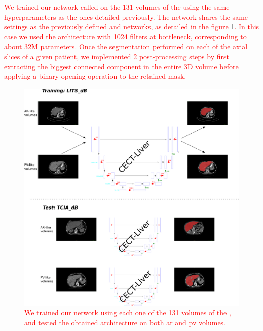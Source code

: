 \textcolor{red}
{
We trained our network called  on the 131 volumes of the
\textbf{} using the same hyperparameters as the ones detailed
previously. The network shares the same settings as the previously defined  and  networks, as detailed in the figure \ref{fig:CECTliverDetails}. In this case we used the architecture with 1024 filters at bottleneck, corresponding to about 32M parameters. Once the segmentation performed on each of the axial slices of a given patient, we implemented 2 post-processing steps by first extracting the biggest connected component in the entire 3D volume before applying a binary opening operation to the retained mask.
\begin{figure}[!ht]
	\begin{mdframed}[backgroundcolor=blue!50,linecolor=blue!50]
		\centering
		\includegraphics[width=\linewidth]{images/CECT_liver_details}
		\caption{We trained our network using each one of the 131 volumes of the \textbf{}, and tested the obtained architecture on both \ac{ar} and \ac{pv} \textbf{} volumes. 
		}
		\label{fig:CECTliverDetails}
	\end{mdframed}
\end{figure}
}

